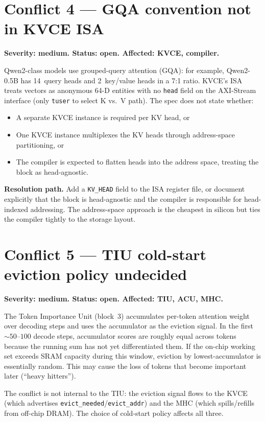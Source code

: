 \documentclass[11pt]{article}
\begin{document}
\section{Conflict 4 --- GQA convention not in KVCE ISA}
\label{sec:c4}

\textbf{Severity: medium. Status: open. Affected: KVCE, compiler.}

Qwen2-class models use grouped-query attention (GQA): for example,
Qwen2-0.5B has 14~query heads and 2~key/value heads in a 7:1 ratio.
KVCE's ISA treats vectors as anonymous 64-D entities with no
\texttt{head} field on the AXI-Stream interface (only \texttt{tuser}
to select K vs.\ V path). The spec does not state whether:

\begin{itemize}
\item A separate KVCE instance is required per KV head, or
\item One KVCE instance multiplexes the KV heads through
address-space partitioning, or
\item The compiler is expected to flatten heads into the address
space, treating the block as head-agnostic.
\end{itemize}

\textbf{Resolution path.} Add a \texttt{KV\_HEAD} field to the ISA
register file, or document explicitly that the block is
head-agnostic and the compiler is responsible for head-indexed
addressing. The address-space approach is the cheapest in silicon
but ties the compiler tightly to the storage layout.

\section{Conflict 5 --- TIU cold-start eviction policy undecided}
\label{sec:c5}

\textbf{Severity: medium. Status: open. Affected: TIU, ACU, MHC.}

The Token Importance Unit (block~3) accumulates per-token attention
weight over decoding steps and uses the accumulator as the eviction
signal. In the first $\sim 50$--$100$ decode steps, accumulator
scores are roughly equal across tokens because the running sum has
not yet differentiated them. If the on-chip working set exceeds
SRAM capacity during this window, eviction by lowest-accumulator
is essentially random. This may cause the loss of tokens that
become important later (``heavy hitters'').

The conflict is not internal to the TIU: the eviction signal flows
to the KVCE (which advertises \texttt{evict\_needed}/\texttt{evict\_addr})
and the MHC (which spills/refills from off-chip DRAM). The choice
of cold-start policy affects all three.
\end{document}
